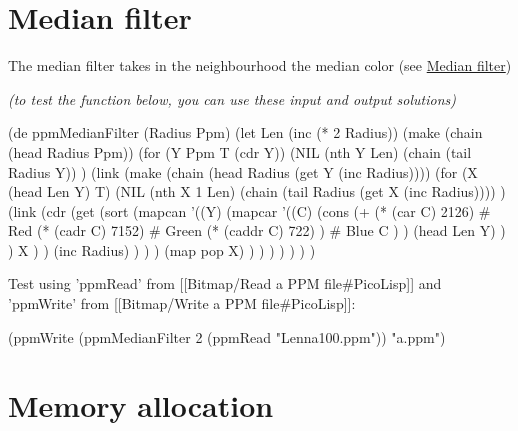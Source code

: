 \pagebreak{}
\section*{Median filter}

The median filter takes in the neighbourhood the median color (see
\href{http://en.wikipedia.org/wiki/Median\_filter}{Median filter})

\emph{(to test the function below, you can use these \emph{input} and
  \emph{output} solutions)}


\begin{wideverbatim}

(de ppmMedianFilter (Radius Ppm)
   (let Len (inc (* 2 Radius))
      (make
         (chain (head Radius Ppm))
         (for (Y Ppm  T  (cdr Y))
            (NIL (nth Y Len)
               (chain (tail Radius Y)) )
            (link
               (make
                  (chain (head Radius (get Y (inc Radius))))
                  (for (X (head Len Y) T)
                     (NIL (nth X 1 Len)
                        (chain (tail Radius (get X (inc Radius)))) )
                     (link
                        (cdr
                           (get
                              (sort
                                 (mapcan
                                    '((Y)
                                       (mapcar
                                          '((C)
                                             (cons
                                                (+
                                                   (* (car C) 2126)     # Red
                                                   (* (cadr C) 7152)    # Green
                                                   (* (caddr C) 722) )  # Blue
                                                C ) )
                                          (head Len Y) ) )
                                    X ) )
                              (inc Radius) ) ) )
                     (map pop X) ) ) ) ) ) ) )

Test using 'ppmRead' from [[Bitmap/Read a PPM file#PicoLisp]] and 'ppmWrite'
from [[Bitmap/Write a PPM file#PicoLisp]]:

(ppmWrite (ppmMedianFilter 2 (ppmRead "Lenna100.ppm")) "a.ppm")

\end{wideverbatim}

\pagebreak{}
\section*{Memory allocation}

